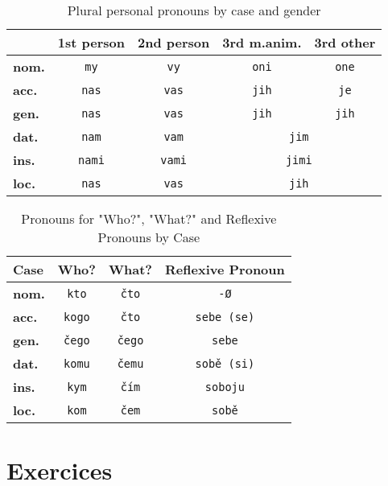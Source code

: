 \documentclass{article}
\begin{document}
\begin{table}[h!]
\centering
\renewcommand{\arraystretch}{1.3}
\begin{tabular}{|l|c|c|c|c|}
\hline
\textbf{} & \textbf{1st person} & \textbf{2nd person} & \textbf{3rd m.anim.} & \textbf{3rd other} \\
\hline
\textbf{nom.} & \texttt{my} & \texttt{vy} & \texttt{oni} & \texttt{one} \\
\hline
\textbf{acc.} & \texttt{nas} & \texttt{vas} & \texttt{jih} & \texttt{je} \\
\hline
\textbf{gen.} & \texttt{nas} & \texttt{vas} & \texttt{jih} & \texttt{jih} \\
\hline
\textbf{dat.} & \texttt{nam} & \texttt{vam} & \multicolumn{2}{c|}{\texttt{jim}} \\
\hline
\textbf{ins.} & \texttt{nami} & \texttt{vami} & \multicolumn{2}{c|}{\texttt{jimi}} \\
\hline
\textbf{loc.} & \texttt{nas} & \texttt{vas} & \multicolumn{2}{c|}{\texttt{jih}} \\
\hline
\end{tabular}
\caption{Plural personal pronouns by case and gender}
\end{table}
\newpage
\begin{table}[htbp]
\centering
\renewcommand{\arraystretch}{1.3}
\begin{tabular}{|l|c|c|c|}
\hline
\textbf{Case} & \textbf{Who?} & \textbf{What?} & \textbf{Reflexive Pronoun} \\
\hline
\textbf{nom.} & \texttt{kto} & \texttt{čto} & \texttt{-Ø} \\
\hline
\textbf{acc.} & \texttt{kogo} & \texttt{čto} & \texttt{sebe (se)} \\
\hline
\textbf{gen.} & \texttt{čego} & \texttt{čego} & \texttt{sebe} \\
\hline
\textbf{dat.} & \texttt{komu} & \texttt{čemu} & \texttt{sobě (si)} \\
\hline
\textbf{ins.} & \texttt{kym} & \texttt{čím} & \texttt{soboju} \\
\hline
\textbf{loc.} & \texttt{kom} & \texttt{čem} & \texttt{sobě} \\
\hline
\end{tabular}
\caption{Pronouns for "Who?", "What?" and Reflexive Pronouns by Case}
\end{table}
\section{Exercices}
\end{document}
